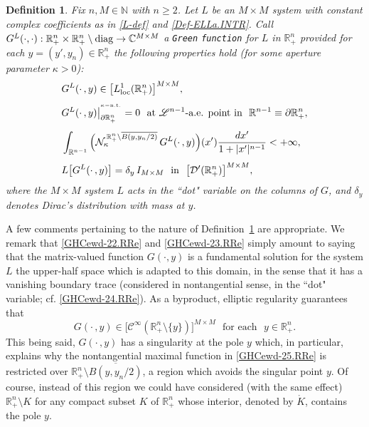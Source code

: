 \documentclass[11pt,reqno]{amsart}
\numberwithin{equation}{section}
\newtheorem{definition}[theorem]{Definition}
\theoremstyle{remark}
\begin{document}
\begin{definition}\label{ta.av-GGG}
Fix $n,M\in{\mathbb{N}}$ with $n\geq 2$.
Let $L$ be an $M\times M$ system with constant complex coefficients as in \eqref{L-def} and \eqref{Def-ELLa.INTR}. 
Call $G^L(\cdot,\cdot):{\mathbb{R}}^n_{+}\times{\mathbb{R}}^n_{+}\setminus{\rm diag}\to{\mathbb{C}}^{M\times M}$ 
a {\tt Green} {\tt function} for $L$ in ${\mathbb{R}}^n_{+}$ provided for each $y=(y',y_n)\in\mathbb{R}^n_{+}$ 
the following properties hold {\rm (}for some aperture parameter $\kappa>0${\rm )}:
%
\begin{align}\label{GHCewd-22.RRe}
& G^L(\cdot\,,y)\in\big[L^1_{\rm loc}({\mathbb{R}}^n_{+})\big]^{M\times M},
\\[4pt]
& G^L(\cdot\,,y)\big|^{{}^{\kappa-{\rm n.t.}}}_{\partial{\mathbb{R}}^n_{+}}=0
\,\,\text{ at ${\mathscr{L}}^{n-1}$-a.e. point in }\,\,{\mathbb{R}}^{n-1}\equiv\partial{\mathbb{R}}^n_{+},
\label{GHCewd-24.RRe}
\\[4pt]
& \int_{{\mathbb{R}}^{n-1}}\Big(
{\mathcal{N}}^{\,{\mathbb{R}}^n_{+}\setminus\overline{B(y,y_n/2)}}_{\kappa}\,G^L(\cdot\,,y)\Big)(x')\frac{dx'}{1+|x'|^{n-1}}<+\infty,
\label{GHCewd-25.RRe}
\\[4pt]
& L\big[G^L(\cdot\,,y)\big]=\delta_{y}\,I_{M\times M}\,\,\text{ in }\,\,\big[{\mathcal{D}}'({\mathbb{R}}^n_{+})\big]^{M\times M},
\label{GHCewd-23.RRe}
\end{align}
%
where the $M\times M$ system $L$ acts in the ``dot" variable on the columns of $G$, 
and $\delta_y$ denotes Dirac's distribution with mass at $y$.  
\end{definition}

A few comments pertaining to the nature of Definition~\ref{ta.av-GGG} are appropriate. 
We remark that \eqref{GHCewd-22.RRe} and \eqref{GHCewd-23.RRe} simply amount to saying that the 
matrix-valued function $G(\cdot,y)$ is a fundamental solution for the system $L$ the upper-half space 
which is adapted to this domain, in the sense that it has a vanishing boundary trace 
(considered in nontangential sense, in the ``dot" variable; cf. \eqref{GHCewd-24.RRe}).
As a byproduct, elliptic regularity guarantees that 
%
\begin{equation}\label{GHCvCbN.2T}
G(\cdot\,,y)\in\big[{\mathscr{C}}^\infty({\mathbb{R}}^n_{+}\setminus\{y\})\big]^{M\times M}
\,\,\text{ for each }\,\,y\in\mathbb{R}^n_{+}.
\end{equation}
%
This being said, $G(\cdot\,,y)$ has a singularity at the pole $y$ which, in particular, 
explains why the nontangential maximal function in \eqref{GHCewd-25.RRe} is restricted over 
${\mathbb{R}}^n_{+}\setminus\overline{B(y,y_n/2)}$, a region which avoids the singular point $y$. 
Of course, instead of this region we could have considered (with the same effect) 
${\mathbb{R}}^n_{+}\setminus K$ for any compact subset $K$ of ${\mathbb{R}}^n_{+}$ whose interior, 
denoted by $\mathring{K}$, contains the pole $y$. 
\end{document}

